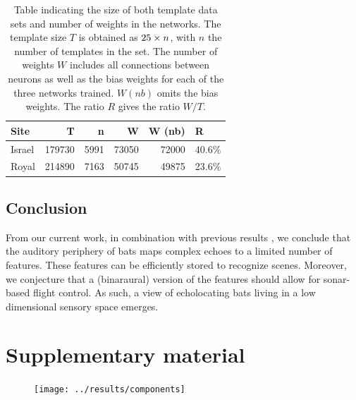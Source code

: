 \documentclass[preprint,5p]{elsarticle}
\begin{document}
\begin{table}
	\centering
	\begin{tabular}{lrrrrl}
		\toprule
		Site &       T &     n &      W &  W (nb) &      R \\
		\midrule
		Israel &  179730 &  5991 &  73050 &   72000 &  40.6\% \\
		Royal &  214890 &  7163 &  50745 &   49875 &  23.6\% \\
		\bottomrule
	\end{tabular}
	\label{tab:sizes}
	\caption{Table indicating the size of both template data sets and number of weights in the networks. The template size $T$ is obtained as $25 \times n$, with $n$ the number of templates in the set. The number of weights $W$ includes all connections between neurons as well as the bias weights for each of the three networks trained. $W (nb)$ omits the bias weights. The ratio $R$ gives the ratio $W/T$.}
\end{table}


\subsection{Conclusion}

From our current work, in combination with previous results \citep{Vanderelst2016,Vanderelst2015a,Mansour2019}, we conclude that the auditory periphery of bats maps complex echoes to a limited number of features. These features can be efficiently stored to recognize scenes. Moreover, we conjecture that a (binaraural) version of the features should allow for sonar-based flight control. As such, a view of echolocating bats living in a low dimensional sensory space emerges.






\onecolumn
\appendix
\section{Supplementary material}
\begin{figure}[h]
	\centering
	\texttt{[image: ../results/components]}
	\caption{}
	\label{fig:components}
\end{figure}
\end{document}
